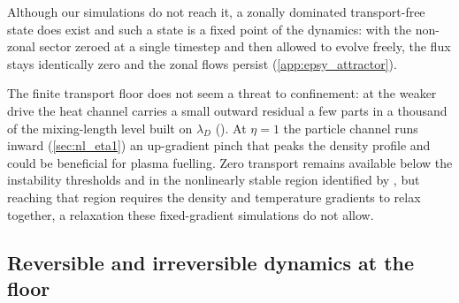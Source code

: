 \documentclass{jpp}
\newcommand{\lambdaD}{\lambda_D}
\begin{document}
Although our simulations do not reach it, a zonally dominated transport-free state does exist and such a state is a fixed point of the dynamics: with the non-zonal sector zeroed at a single timestep and then allowed to evolve freely, the flux stays identically zero and the zonal flows persist (\cref{app:epsy_attractor}).

The finite transport floor does not seem a threat to confinement: at the weaker drive the heat channel carries a small outward residual a few parts in a thousand of the mixing-length level built on $\lambdaD$ ().  At $\eta = 1$ the particle channel runs inward (\cref{sec:nl_eta1}) an up-gradient pinch that peaks the density profile and could be beneficial for plasma fuelling. Zero transport remains available below the instability thresholds and in the nonlinearly stable region identified by \cite{Helander2017}, but reaching that region requires the density and temperature gradients to relax together, a relaxation these fixed-gradient simulations do not allow. 

\subsection{Reversible and irreversible dynamics at the floor}\label{sec:rev_irr}
\end{document}
